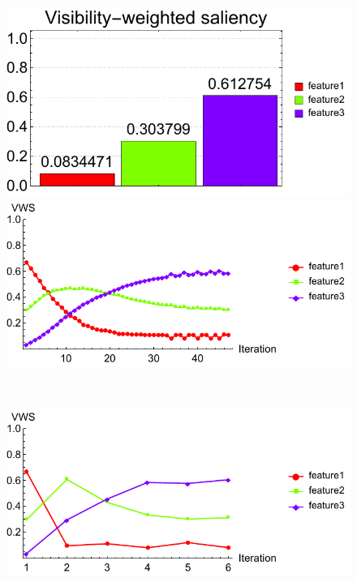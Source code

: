 \begin{figure}
\begin{minipage}{.25\textwidth}
		\subcaption{}
	\end{minipage}~
	\begin{minipage}{.25\textwidth}
		\includegraphics[width=1\linewidth]{figures/CT-Knee_naive_optimized_linesearch_visibility_saliency_weighted_chart}
		\subcaption{}
	\end{minipage}	
	
	\begin{minipage}{.49\textwidth}
		\includegraphics[width=1\linewidth]{figures/CT-Knee_naive_saliency_fixed}
		\subcaption{}
	\end{minipage}~
	\begin{minipage}{.49\textwidth}
		\includegraphics[width=1\linewidth]{figures/CT-Knee_naive_saliency_parallelsearch}
		\subcaption{}
	\end{minipage}
	

\end{figure}
